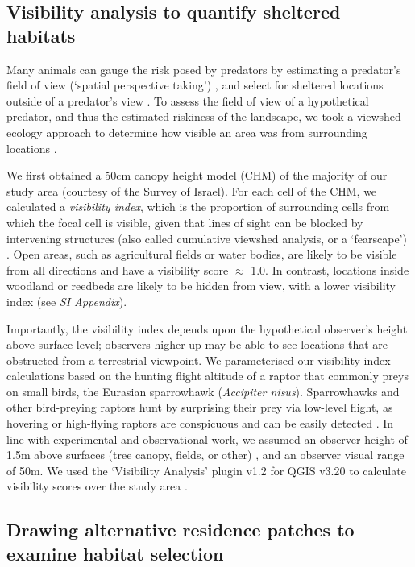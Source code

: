 \begin{refsection}
\subsection{Visibility analysis to quantify sheltered habitats}

Many animals can gauge the risk posed by predators by estimating a predator's field of view (`spatial perspective taking') \cite{emery2000,bruce2003,davidson2016}, and select for sheltered locations outside of a predator's view \citep{hampton1994,krams2001,watve2002}.
To assess the field of view of a hypothetical predator, and thus the estimated riskiness of the landscape, we took a viewshed ecology approach to determine how visible an area was from surrounding locations \citep{aben2018,aben2021}.

We first obtained a 50cm canopy height model (CHM) \citep{aben2021} of the majority of our study area (courtesy of the Survey of Israel).
For each cell of the CHM, we calculated a \textit{visibility index}, which is the proportion of surrounding cells from which the focal cell is visible, given that lines of sight can be blocked by intervening structures (also called cumulative viewshed analysis, or a `fearscape') \cite{olsoy2015}.
Open areas, such as agricultural fields or water bodies, are likely to be visible from all directions and have a visibility score $\approx$ 1.0.
In contrast, locations inside woodland or reedbeds are likely to be hidden from view, with a lower visibility index (see \textit{SI Appendix}).

Importantly, the visibility index depends upon the hypothetical observer's height above surface level; observers higher up may be able to see locations that are obstructed from a terrestrial viewpoint.
We parameterised our visibility index calculations based on the hunting flight altitude of a raptor that commonly preys on small birds, the Eurasian sparrowhawk (\textit{Accipiter nisus}).
Sparrowhawks and other bird-preying raptors hunt by surprising their prey via low-level flight, as hovering or high-flying raptors are conspicuous and can be easily detected \cite{krams2001,krams2020}.
In line with experimental and observational work, we assumed an observer height of 1.5m above surfaces (tree canopy, fields, or other) \citep{seress2011,krams2020}, and an observer visual range of 50m.
We used the `Visibility Analysis' plugin v1.2 for QGIS v3.20 to calculate visibility scores over the study area \citep{cuckovic2016}.

\subsection{Drawing alternative residence patches to examine habitat selection}


\end{refsection}

